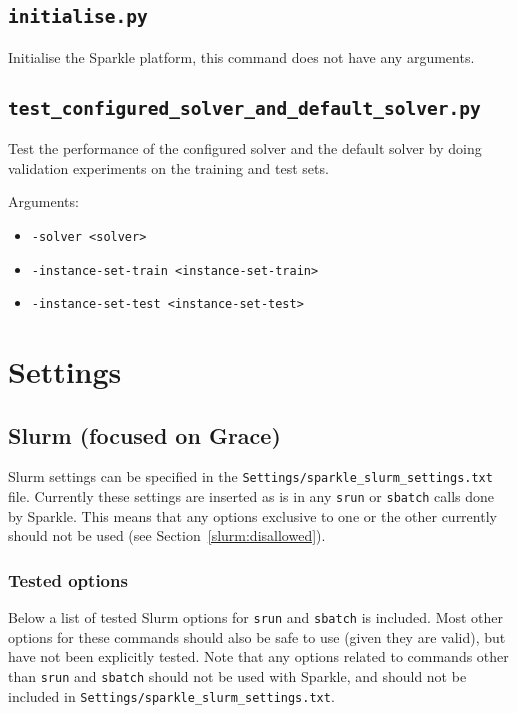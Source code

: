 \documentclass{article}
\begin{document}
\subsection{\texttt{initialise.py}}
\label{cmd:initialise}

Initialise the Sparkle platform, this command does not have any arguments.

\subsection{\texttt{test\_configured\_solver\_and\_default\_solver.py}}
\label{cmd:test_configured_solver_and_default_solver}
Test the performance of the configured solver and the default solver by doing validation experiments on the training and test sets.

Arguments:
\begin{itemize}[noitemsep]
  \item[] \texttt{-solver <solver>}
  \item[] \texttt{-instance-set-train <instance-set-train>}
  \item[] \texttt{-instance-set-test <instance-set-test>}
\end{itemize}

\section{Settings}

\subsection{Slurm (focused on Grace)}
Slurm settings can be specified in the \texttt{Settings/sparkle\_slurm\_settings.txt} file. Currently these settings are inserted as is in any \texttt{srun} or \texttt{sbatch} calls done by Sparkle. This means that any options exclusive to one or the other currently should not be used (see Section~\ref{slurm:disallowed}).

\subsubsection{Tested options}
Below a list of tested Slurm options for \texttt{srun} and \texttt{sbatch} is included. Most other options for these commands should also be safe to use (given they are valid), but have not been explicitly tested. Note that any options related to commands other than \texttt{srun} and \texttt{sbatch} should not be used with Sparkle, and should not be included in \texttt{Settings/sparkle\_slurm\_settings.txt}.
\end{document}
